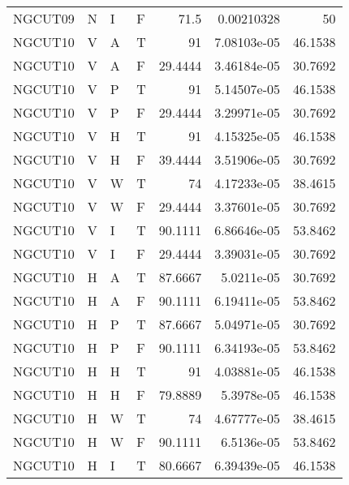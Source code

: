 \begin{longtable}{llllrrr}
    NGCUT09  & N         & I         & F          & 71.5       & 0.00210328  & 50       \\
    NGCUT10  & V         & A         & T          & 91         & 7.08103e-05 & 46.1538  \\
    NGCUT10  & V         & A         & F          & 29.4444    & 3.46184e-05 & 30.7692  \\
    NGCUT10  & V         & P         & T          & 91         & 5.14507e-05 & 46.1538  \\
    NGCUT10  & V         & P         & F          & 29.4444    & 3.29971e-05 & 30.7692  \\
    NGCUT10  & V         & H         & T          & 91         & 4.15325e-05 & 46.1538  \\
    NGCUT10  & V         & H         & F          & 39.4444    & 3.51906e-05 & 30.7692  \\
    NGCUT10  & V         & W         & T          & 74         & 4.17233e-05 & 38.4615  \\
    NGCUT10  & V         & W         & F          & 29.4444    & 3.37601e-05 & 30.7692  \\
    NGCUT10  & V         & I         & T          & 90.1111    & 6.86646e-05 & 53.8462  \\
    NGCUT10  & V         & I         & F          & 29.4444    & 3.39031e-05 & 30.7692  \\
    NGCUT10  & H         & A         & T          & 87.6667    & 5.0211e-05  & 30.7692  \\
    NGCUT10  & H         & A         & F          & 90.1111    & 6.19411e-05 & 53.8462  \\
    NGCUT10  & H         & P         & T          & 87.6667    & 5.04971e-05 & 30.7692  \\
    NGCUT10  & H         & P         & F          & 90.1111    & 6.34193e-05 & 53.8462  \\
    NGCUT10  & H         & H         & T          & 91         & 4.03881e-05 & 46.1538  \\
    NGCUT10  & H         & H         & F          & 79.8889    & 5.3978e-05  & 46.1538  \\
    NGCUT10  & H         & W         & T          & 74         & 4.67777e-05 & 38.4615  \\
    NGCUT10  & H         & W         & F          & 90.1111    & 6.5136e-05  & 53.8462  \\
    NGCUT10  & H         & I         & T          & 80.6667    & 6.39439e-05 & 46.1538  \\

\end{longtable}
